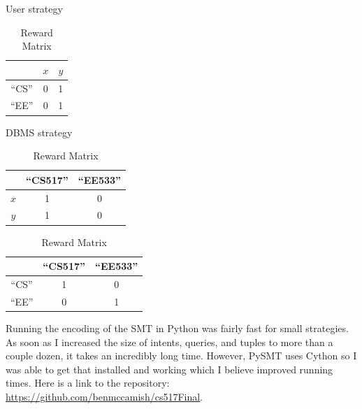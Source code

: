 \documentclass{article}
\begin{document}
\begin{table}[h!]
    \centering
    \begin{minipage}{.2\linewidth}
        \caption{User strategy}
        \centering
        \begin{tabular}{c|c|c|}
            \cline{2-3}
             & \multicolumn{1}{c|}{$x$} & $y$\\
            \hline
            \multicolumn{1}{|c|}{``CS''} & 0 & 1\\
            \hline
            \multicolumn{1}{|c|}{``EE''} & 0 & 1\\
            \hline
        \end{tabular}
        \label{paper:strategies:sender}
    \end{minipage}
    \begin{minipage}{.35\linewidth}
        \caption{DBMS strategy}
        \centering
        \begin{tabular}{c|c|c|}
            \cline{2-3}
             & \multicolumn{1}{c|}{``CS517''} & ``EE533''\\
            \hline
            \multicolumn{1}{|c|}{$x$} & 1 & 0\\
            \hline
            \multicolumn{1}{|c|}{$y$} & 1 & 0\\
            \hline
        \end{tabular}
        \label{paper:strategies:receiver}
    \end{minipage}
       \begin{minipage}{.3\linewidth}
        \caption{Reward Matrix}
        \centering
        \begin{tabular}{c|c|c|}
            \cline{2-3}
             & \multicolumn{1}{c|}{``CS517''} & ``EE533''\\
            \hline
            \multicolumn{1}{|c|}{``CS''} & 1 & 0\\
            \hline
            \multicolumn{1}{|c|}{``EE''} & 0 & 1\\
            \hline
        \end{tabular}
        \label{paper:strategies:reward}
    \end{minipage}
\end{table}

Running the encoding of the SMT in Python was fairly fast for small strategies. As soon as I increased the size of intents, queries, and tuples to more than a couple dozen, it takes an incredibly long time. However, PySMT uses Cython so I was able to get that installed and working which I believe improved running times. Here is a link to the repository: \url{https://github.com/benmccamish/cs517Final}.



\end{document}
